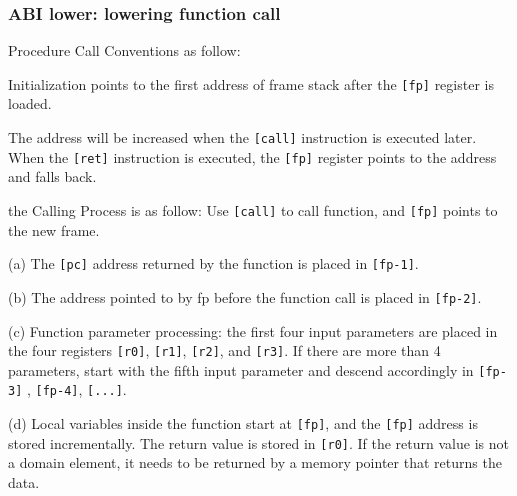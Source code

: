 \subsubsection{ABI lower: lowering function call}
    
Procedure Call Conventions as follow:

Initialization points to the first address of frame stack after the \texttt{[fp]} register is loaded.
    
The address will be increased when the \texttt{[call]}  instruction is executed later. When the \texttt{[ret]} instruction is executed, the \texttt{[fp]} register points to the address and falls back.
    
    
the Calling Process is as follow:
    Use  \texttt{[call]} to call function, and \texttt{[fp]} points to the new frame.\par
    (a) The \texttt{[pc]} address returned by the function is placed in \texttt{[fp-1]}.\par
    (b) The address pointed to by fp before the function call is placed in  \texttt{[fp-2]}.\par
    (c) Function parameter processing: the first four input parameters are placed in the four registers \texttt{[r0]}, \texttt{[r1]}, \texttt{[r2]}, and \texttt{[r3]}. If there are more than 4 parameters, start with the fifth input parameter and descend accordingly in \texttt{[fp-3]} , \texttt{[fp-4]}, \texttt{[...]}. \par
    (d) Local variables inside the function start at \texttt{[fp]}, and the \texttt{[fp]} address is stored incrementally. The return value is stored in \texttt{[r0]}. If the return value is not a domain element, it needs to be returned by a memory pointer that returns the data.\par